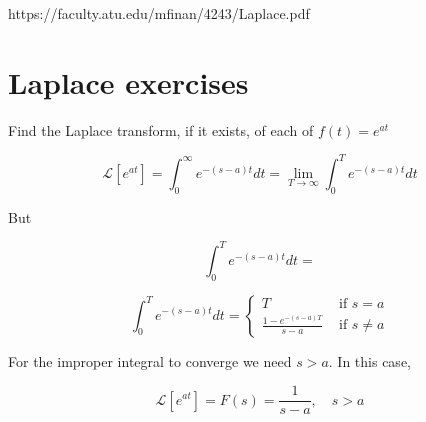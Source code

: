 \documentclass[12pt]{article}
\begin{document}
https://faculty.atu.edu/mfinan/4243/Laplace.pdf
\section*{Laplace exercises}

Find the Laplace transform, if it exists, of each of $f(t)=e^{a t}$

$$
\mathcal{L}\left[e^{a t}\right]=\int_0^{\infty} e^{-(s-a) t} d t=\lim _{T \rightarrow \infty} \int_0^T e^{-(s-a) t} d t
$$

But

$$
\int_0^T e^{-(s-a) t} d t =
$$

$$
\int_0^T e^{-(s-a) t} d t=\left\{\begin{array}{cl}
T & \text { if } s=a \\
\frac{1-e^{-(s-a) T}}{s-a} & \text { if } s \neq a
\end{array}\right.
$$

For the improper integral to converge we need $s>a$. In this case,

$$
\mathcal{L}\left[e^{a t}\right]=F(s)=\frac{1}{s-a}, \quad s>a
$$
\end{document}
